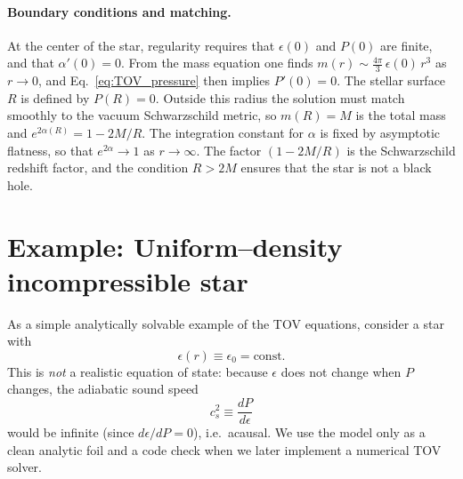 \paragraph{Boundary conditions and matching.}
At the center of the star, regularity requires that $\epsilon(0)$ and $P(0)$ are finite, and that $\alpha'(0)=0$.  
From the mass equation one finds $m(r)\sim \tfrac{4\pi}{3}\,\epsilon(0)\,r^{3}$ as $r\to 0$, 
and Eq.~\eqref{eq:TOV_pressure} then implies $P'(0)=0$.  
The stellar surface $R$ is defined by $P(R)=0$.  
Outside this radius the solution must match smoothly to the vacuum Schwarzschild metric, 
so $m(R)=M$ is the total mass and $e^{2\alpha(R)}=1-2M/R$.  
The integration constant for $\alpha$ is fixed by asymptotic flatness, 
so that $e^{2\alpha}\to 1$ as $r\to\infty$.  
The factor $(1-2M/R)$ is the Schwarzschild redshift factor, and the condition $R>2M$ 
ensures that the star is not a black hole.

\section*{Example: Uniform--density incompressible star}

As a simple analytically solvable example of the TOV equations, consider a star with
\begin{equation}
\epsilon(r)\equiv \epsilon_{0}=\text{const}.
\label{eq:const_density_assumption}
\end{equation}
This is \emph{not} a realistic equation of state: because $\epsilon$ does not change when $P$ changes, the adiabatic sound speed
\[
c_{s}^{2} \equiv \frac{dP}{d\epsilon}
\]
would be infinite (since $d\epsilon/dP=0$), i.e.\ acausal. We use the model only as a clean analytic foil and a code check when we later implement a numerical TOV solver.

